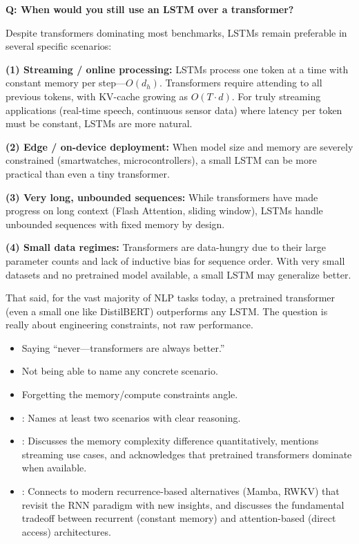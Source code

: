 \begin{interviewq}
\textbf{Q: When would you still use an LSTM over a transformer?}

 \quad {} \quad
\badgefreq{\freqmed}

\stronganswer
Despite transformers dominating most benchmarks, LSTMs remain preferable
in several specific scenarios:

\textbf{(1) Streaming / online processing:}  LSTMs process one token at a
time with constant memory per step---$O(d_h)$.  Transformers require
attending to all previous tokens, with KV-cache growing as $O(T \cdot d)$.
For truly streaming applications (real-time speech, continuous sensor
data) where latency per token must be constant, LSTMs are more natural.

\textbf{(2) Edge / on-device deployment:}  When model size and memory are
severely constrained (smartwatches, microcontrollers), a small LSTM can
be more practical than even a tiny transformer.

\textbf{(3) Very long, unbounded sequences:}  While transformers have
made progress on long context (Flash Attention, sliding window), LSTMs
handle unbounded sequences with fixed memory by design.

\textbf{(4) Small data regimes:}  Transformers are data-hungry due to
their large parameter counts and lack of inductive bias for sequence
order.  With very small datasets and no pretrained model available, a
small LSTM may generalize better.

That said, for the vast majority of NLP tasks today, a pretrained
transformer (even a small one like DistilBERT) outperforms any LSTM.
The question is really about engineering constraints, not raw
performance.

\redflags
\begin{itemize}
\item Saying ``never---transformers are always better.''
\item Not being able to name any concrete scenario.
\item Forgetting the memory/compute constraints angle.
\end{itemize}


\goodgreat
\begin{itemize}
\item {}: Names at least two scenarios with clear reasoning.
\item {}: Discusses the memory complexity difference
  quantitatively, mentions streaming use cases, and acknowledges that
  pretrained transformers dominate when available.
\item {}: Connects to modern recurrence-based alternatives
  (Mamba, RWKV) that revisit the RNN paradigm with new insights, and
  discusses the fundamental tradeoff between recurrent (constant memory)
  and attention-based (direct access) architectures.
\end{itemize}


\end{interviewq}
